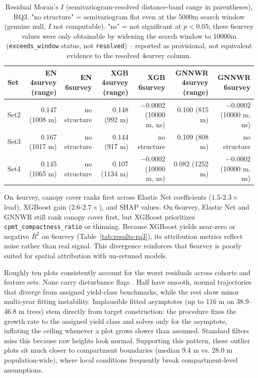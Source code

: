 \begin{table}[!htbp]
\centering
\scriptsize
\setlength{\tabcolsep}{4pt}
\renewcommand{\arraystretch}{1.2}
\begin{tabular}{lrrrrrr}
\toprule
Set & EN 4survey (range) & EN 6survey & XGB 4survey (range) & XGB 6survey & GNNWR 4survey (range) & GNNWR 6survey \\
\midrule
Set2 & 0.147 (1008 m) & no structure & 0.148 (992 m) & $-0.0002$ (10000 m, ns) & 0.100 (815 m) & $-0.0002$ (10000 m, ns) \\
Set3 & 0.167 (1017 m) & no structure & 0.144 (917 m) & no structure & 0.109 (808 m) & no structure \\
Set4 & 0.145 (1065 m) & no structure & 0.107 (1134 m) & $-0.0002$ (10000 m, ns) & 0.082 (1252 m) & $-0.0002$ (10000 m, ns) \\
\bottomrule
\end{tabular}
\caption{Residual Moran's $I$ (semivariogram-resolved distance-band range in parentheses), RQ3.
"no structure" = semivariogram flat even at the 5000m search window (genuine null, $I$ not
computable). "ns" = not significant at $p<0.05$; these 6survey values were only obtainable by
widening the search window to 10000m (\texttt{exceeds\_window} status, not \texttt{resolved}) --
reported as provisional, not equivalent evidence to the resolved 4survey column.}
\label{tab:results-rq3-morans}
\end{table}


On 4survey, canopy cover ranks first across Elastic Net coefficients ($1.5\text{-}2.3\times$ lead), XGBoost gain ($2.6\text{-}2.7 \times $), and SHAP values. On 6survey, Elastic Net and GNNWR still rank canopy cover first, but XGBoost prioritizes \texttt{cpmt\_compactness\_ratio} or thinning. Because XGBoost yields near-zero or negative $R^2$ on 6survey (Table~\ref{tab:results-rq3}), its attribution metrics reflect noise rather than real signal. This divergence reinforces that 6survey is poorly suited for spatial attribution with un-retuned models. 

Roughly ten plots consistently account for the worst residuals across cohorts and feature sets. None carry disturbance flags . Half have smooth, normal trajectories that diverge from assigned yield-class benchmarks, while the rest show minor multi-year fitting instability. Implausible fitted asymptotes (up to 116 m on 38.9–46.8 m trees) stem directly from target construction: the procedure fixes the growth rate to the assigned yield class and solves only for the asymptote, inflating the ceiling whenever a plot grows slower than assumed. Standard filters miss this because raw heights look normal. Supporting this pattern, these outlier plots sit much closer to compartment boundaries (median 9.4 m vs. 28.0 m population-wide), where local conditions  frequently break compartment-level assumptions.


